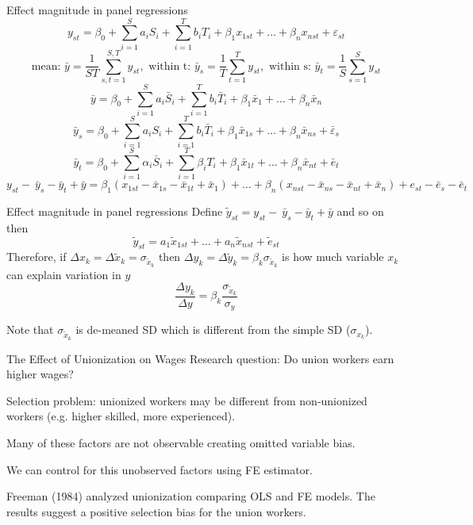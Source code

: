 \documentclass{beamer}
\begin{document}
\begin{frame}{Effect magnitude in panel regressions}
\[y_{st}=\beta_0+\sum_{i=1}^{S}{a_iS_i}+\sum_{i=1}^{T}{b_iT_i}+\beta_1x_{1st}+\ldots+\beta_nx_{nst}+\varepsilon_{st}\]
\[\text{mean: } \bar{y}=\frac{1}{ST}\sum_{s,t=1}^{S,T}y_{st}, \text{ within  t: } \bar{y}_s=\frac{1}{T}\sum_{t=1}^{T}y_{st},\text{ within s: }\bar{y}_t= \frac{1}{S}\sum_{s=1}^{S}y_{st} \]
\[\bar{y}=\beta_0+\sum_{i=1}^{S}{a_i{\bar{S}}_i}+\sum_{i=1}^{T}{b_i{\bar{T}}_i}+\beta_1{\bar{x}}_1+\ldots+\beta_n{\bar{x}}_n\]
\[ {\bar{y}}_s=\beta_0+\sum_{i=1}^{S}{a_iS_i}+\sum_{i=1}^{T}{b_i{\bar{T}}_i}+\beta_1{\bar{x}}_{1s}+\ldots+\beta_n{\bar{x}}_{ns}+{\bar{\varepsilon}}_s \]
\[{\bar{y}}_t=\beta_0+\sum_{i=1}^{S}{\alpha_i{\bar{S}}_i}+\sum_{i=1}^{T}{\beta_iT_i}+\beta_1{\bar{x}}_{1t}+\ldots+\beta_n{\bar{x}}_{nt}+{\bar{e}}_t\]
\[y_{st}-\ {\bar{y}}_s-{\bar{y}}_t+\bar{y}=\beta_1\left(x_{1st}-{\bar{x}}_{1s}-{\bar{x}}_{1t}+{\bar{x}}_1\right)+\ldots+\beta_n\left(x_{nst}-{\bar{x}}_{ns}-{\bar{x}}_{nt}+{\bar{x}}_n\right)+e_{st}-{\bar{e}}_s-{\bar{e}}_t \]
\end{frame}

\begin{frame}{Effect magnitude in panel regressions}
Define $\tilde{y}_{st}=y_{st}-\ {\bar{y}}_s-{\bar{y}}_t+\bar{y}$ and so on then
\[ {\tilde{y}}_{st}=a_1{\tilde{x}}_{1st}+\ldots+a_n{\tilde{x}}_{nst}+{\tilde{e}}_{st} \]
Therefore, if $\Delta x_k=\Delta \tilde{x}_k=\sigma_{\tilde{x}_k}$  then $\Delta y_k=\Delta \tilde{y}_k=\beta_k\sigma_{\tilde{x}_k}$ is how much variable $x_k$ can explain variation in $y$
\[\frac{\Delta y_k}{\Delta y}=\beta_k\frac{\sigma_{\tilde{x}_k}}{\sigma_y}\]

Note that $\sigma_{{\tilde{x}}_k}$ is de-meaned SD which is different from the simple SD ($\sigma_{x_k}$).
\end{frame}

\begin{frame}{The Effect of Unionization on Wages}
Research question: Do union workers earn higher wages?\bigskip

Selection problem: unionized workers may be different from non-unionized workers (e.g. higher skilled, more experienced).\bigskip

Many of these factors are not observable creating omitted variable bias.\bigskip

We can control for this unobserved factors using FE estimator.\medskip

Freeman (1984) analyzed unionization comparing OLS and FE models. The results suggest a positive selection bias for the union workers.

\end{frame}
\end{document}
